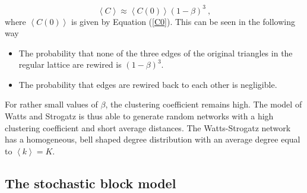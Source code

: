 \documentclass[11 pt , letterpaper , twoside , openright]{book}
\begin{document}
\begin{equation}
	\left<C\right> \approx \left<C(0)\right>(1-\beta)^3 \ ,
\end{equation} 
where $\left<C(0)\right>$ is given by Equation (\ref{C0}). This can be seen in the following way
\begin{itemize}
	\item The probability that none of the three edges of the original triangles in the regular lattice are rewired is $(1-\beta)^3$.
	\item The probability that edges are rewired back to each other is negligible.
\end{itemize}
For rather small values of $\beta$, the clustering coefficient remains high. The model of Watts and Strogatz is thus able to generate random networks with a high clustering coefficient and short average distances. The Watts-Strogatz network has a homogeneous, bell shaped degree distribution with an average degree equal to $\left<k\right> = K$.

\subsection{The stochastic block model}
\end{document}
